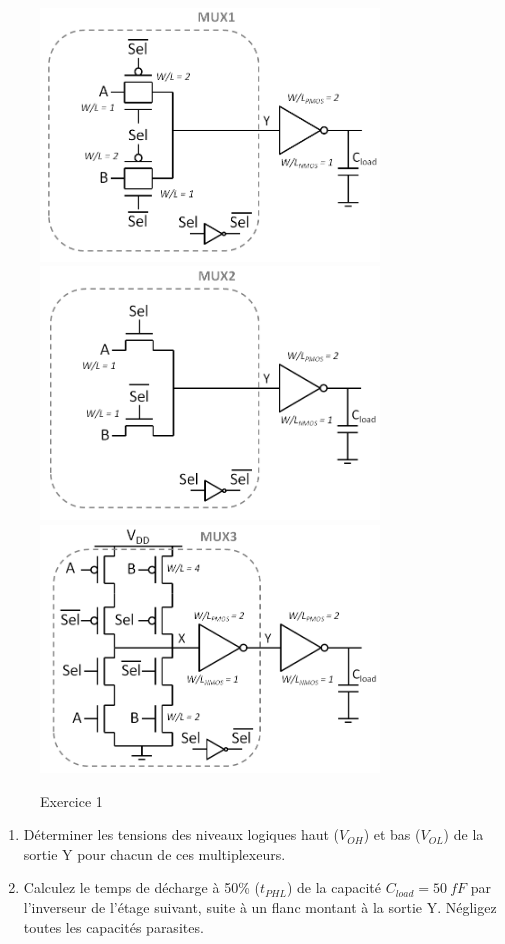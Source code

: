 \documentclass[frenchb,DIV=14]{scrartcl}
\begin{document}
\begin{figure}[!htbp]
   \centering
   \includegraphics[width=9cm]{figures/fig7-3-1.png}
	 \includegraphics[width=9cm]{figures/fig7-3-2.png}
	 \includegraphics[width=9cm]{figures/fig7-3-3.png}
   \caption{Exercice 1}
   \label{fig7-3}
\end{figure}

\begin{enumerate}
	\item Déterminer les tensions des niveaux logiques haut ($V_{OH}$) et bas ($V_{OL}$) de
	la sortie Y pour chacun de ces multiplexeurs.
    \item Calculez le temps de décharge à 50\% ($t_{PHL}$) de la capacité $C_{load} = \SI{50}{fF}$ par
	l'inverseur de l'étage suivant, suite à un flanc montant à la sortie Y. Négligez
        toutes les capacités parasites.
\end{enumerate}
\end{document}

